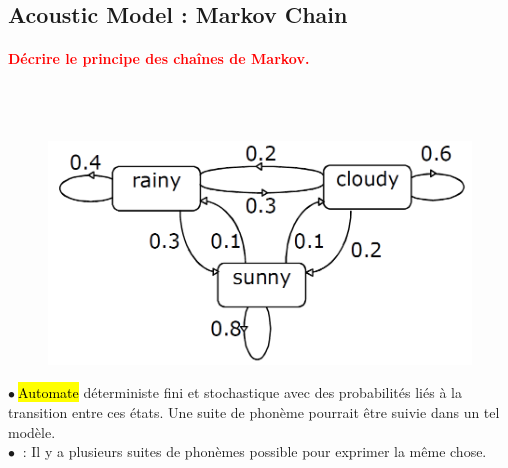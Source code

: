 \documentclass[letterpaper, 12pt]{article}
\newcommand{\red}[1]{
	\textcolor{red}{#1}
}
\newcommand{\myul}[1]{
	\underline{\smash{#1}}
}
\newcommand{\point}{$\bullet\ $}
\begin{document}
	\subsection{Acoustic Model : Markov Chain}
		\paragraph{\red{Décrire le principe des chaînes de Markov.}}~\\~\\
			\begin{minipage}{0.4\textwidth}
				\begin{figure}[H]
					\centering
					\includegraphics[scale=0.225]{Images/markov_chain}
				\end{figure}\noindent
			\end{minipage}\hfill
			\begin{minipage}{0.55\textwidth}
				\point \hl{Automate} déterministe fini et stochastique avec des probabilités liés à la 
					transition entre ces états. Une suite de phonème pourrait être suivie dans un tel modèle.\\
				\point \myul{Problème} : Il y a plusieurs suites de phonèmes possible pour exprimer la même chose.
			\end{minipage}
\end{document}
